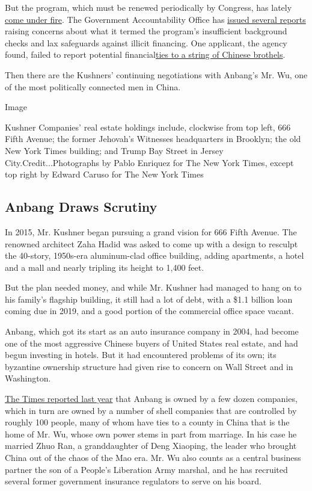 But the program, which must be renewed periodically by Congress, has
lately
\href{https://www.nytimes.com/2016/03/16/us/politics/program-that-lets-foreigners-write-a-check-and-get-a-visa-draws-scrutiny.html}{come
under fire}. The Government Accountability Office has
\href{http://www.gao.gov/products/GAO-16-828}{issued several reports}
raising concerns about what it termed the program's insufficient
background checks and lax safeguards against illicit financing. One
applicant, the agency found, failed to report potential
financial\href{http://www.gao.gov/assets/680/671940.pdf}{ties to a
string of Chinese brothels}.

Then there are the Kushners' continuing negotiations with Anbang's Mr.
Wu, one of the most politically connected men in China.

Image

Kushner Companies' real estate holdings include, clockwise from top
left, 666 Fifth Avenue; the former Jehovah's Witnesses headquarters in
Brooklyn; the old New York Times building; and Trump Bay Street in
Jersey City.Credit...Photographs by Pablo Enriquez for The New York
Times, except top right by Edward Caruso for The New York Times

\hypertarget{anbang-draws-scrutiny}{%
\subsection{Anbang Draws Scrutiny}\label{anbang-draws-scrutiny}}

In 2015, Mr. Kushner began pursuing a grand vision for 666 Fifth Avenue.
The renowned architect Zaha Hadid was asked to come up with a design to
resculpt the 40-story, 1950s-era aluminum-clad office building, adding
apartments, a hotel and a mall and nearly tripling its height to 1,400
feet.

But the plan needed money, and while Mr. Kushner had managed to hang on
to his family's flagship building, it still had a lot of debt, with a
\$1.1 billion loan coming due in 2019, and a good portion of the
commercial office space vacant.

Anbang, which got its start as an auto insurance company in 2004, had
become one of the most aggressive Chinese buyers of United States real
estate, and had begun investing in hotels. But it had encountered
problems of its own; its byzantine ownership structure had given rise to
concern on Wall Street and in Washington.

\href{https://www.nytimes.com/2016/09/02/business/dealbook/anbang-global-shopping-spree-china-mystery-ownership.html}{The
Times reported last year} that Anbang is owned by a few dozen companies,
which in turn are owned by a number of shell companies that are
controlled by roughly 100 people, many of whom have ties to a county in
China that is the home of Mr. Wu, whose own power stems in part from
marriage. In his case he married Zhuo Ran, a granddaughter of Deng
Xiaoping, the leader who brought China out of the chaos of the Mao era.
Mr. Wu also counts as a central business partner the son of a People's
Liberation Army marshal, and he has recruited several former government
insurance regulators to serve on his board.

